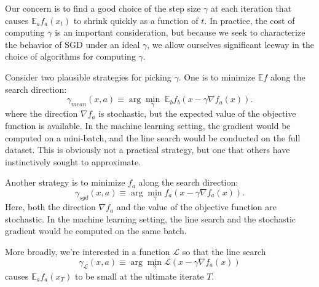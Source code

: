 \documentclass{article}
\newcommand{\E}{\mathbb{E}}
\renewcommand{\L}{\mathcal{L}}
\begin{document}
Our concern is to find a good choice of the step size $\gamma$ at each iteration that causes $\E_a f_a(x_t)$ to shrink quickly as a function of $t$. In practice, the cost of computing $\gamma$ is an important consideration, but because we seek to characterize the behavior of SGD under an ideal $\gamma$, we allow ourselves significant leeway in the choice of algorithms for computing $\gamma$.

Consider two plausible strategies for picking $\gamma$. One is to minimize $\E f$ along the search direction:
$$\gamma_{mean}(x,a) \equiv \arg\min_\gamma\; \E_b f_b(x-\gamma \nabla f_a(x)).$$
where the direction $\nabla f_a$ is stochastic, but the expected value of the objective function is available. In the machine learning setting, the gradient would be computed on a mini-batch, and the line search would be conducted on the full dataset. This is obviously not a practical strategy, but one that others have instinctively sought to approximate.

Another strategy is to minimize $f_a$ along the search direction:
$$\gamma_{sgd}(x,a) \equiv \arg\min_\gamma f_a(x-\gamma \nabla f_a(x)).$$
Here, both the direction $\nabla f_a$ and the value of the objective function are stochastic. In the machine learning setting, the line search and the stochastic gradient would be computed on the same batch.

More broadly, we're interested in a function $\L$ so that the line search
$$\gamma_\L(x,a) \equiv \arg\min_\gamma \L(x-\gamma \nabla f_a(x))$$
causes $\E_a f_a(x_T)$ to be small at the ultimate iterate $T$.
\end{document}
